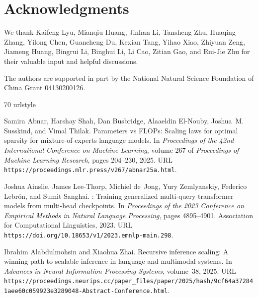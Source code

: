 \documentclass[]{bytedance_seed}
\theoremstyle{definition}
\theoremstyle{remark}
\begin{document}
 \section*{Acknowledgments}
%
We thank Kaifeng Lyu, Mianqiu Huang, Jinhan Li, Tansheng Zhu, Huaqing Zhang, Yilong Chen, Guancheng Du, Kexian Tang, Yihao Xiao, Zhiyuan Zeng, Jiameng Huang, Bingrui Li, Binghui Li, Li Cao, Zitian Gao, and Rui-Jie Zhu for their valuable input and helpful discussions.
%

The authors are supported in part  by the National Natural Science Foundation of China Grant 04130200126.
%

 

%
\begin{thebibliography}{70}
\providecommand{\natexlab}[1]{#1}
\providecommand{\url}[1]{\texttt{#1}}
\expandafter\ifx\csname urlstyle\endcsname\relax
  \providecommand{\doi}[1]{doi: #1}\else
  \providecommand{\doi}{doi: \begingroup \urlstyle{rm}\Url}\fi

Samira Abnar, Harshay Shah, Dan Busbridge, Alaaeldin El-Nouby, Joshua~M.
  Susskind, and Vimal Thilak.
\newblock Parameters vs {FLOP}s: Scaling laws for optimal sparsity for
  mixture-of-experts language models.
\newblock In \emph{Proceedings of the 42nd International Conference on Machine
  Learning}, volume 267 of \emph{Proceedings of Machine Learning Research},
  pages 204--230, 2025.
\newblock URL \url{https://proceedings.mlr.press/v267/abnar25a.html}.

Joshua Ainslie, James Lee-Thorp, Michiel de~Jong, Yury Zemlyanskiy, Federico
  Lebr{\'{o}}n, and Sumit Sanghai.
: Training generalized multi-query transformer models from
  multi-head checkpoints.
\newblock In \emph{Proceedings of the 2023 Conference on Empirical Methods in
  Natural Language Processing}, pages 4895--4901. Association for Computational
  Linguistics, 2023.
\newblock URL \url{https://doi.org/10.18653/v1/2023.emnlp-main.298}.

Ibrahim Alabdulmohsin and Xiaohua Zhai.
\newblock Recursive inference scaling: A winning path to scalable inference in
  language and multimodal systems.
\newblock In \emph{Advances in Neural Information Processing Systems},
  volume~38, 2025.
\newblock URL
  \url{https://proceedings.neurips.cc/paper_files/paper/2025/hash/9cf64a372841aee60c059923e3289048-Abstract-Conference.html}.


\end{thebibliography}
\end{document}
